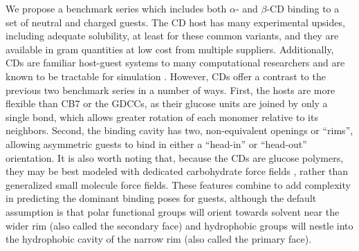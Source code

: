 \documentclass[aps,pre,twocolumn,nofootinbib,superscriptaddress,10pt, final,tightenlines]{revtex4-1}
\begin{document}
We propose a benchmark series which includes both $\alpha$- and $\beta$-CD binding to a set of neutral and charged guests. 
The CD host has many experimental upsides, including adequate solubility, at least for these common variants, and they are available in gram quantities at low cost from multiple suppliers. 
Additionally, CDs are familiar host-guest systems to many computational researchers and are known to be tractable for simulation \cite{Mark:1994:J.Am.Chem.Soc., Luzhkov:1999:ChemicalPhysicsLetters, Bea:2002:TheorChemAcc, Chen:2004:BiophysicalJournal, Sellner:2008:J.Phys.Chem.B, Cai:2009:J.Phys.Chem.B, Wickstrom:2013:J.Chem.TheoryComput., Shi:2014:TheorChemAcc, henriksen_computational_2015, Zhang:2015:J.Chem.TheoryComput., Khuntawee:2016:CarbohydratePolymers, Gebhardt:2016:FluidPhaseEquilibria, wickstrom_parameterization_2016}. 
However, CDs offer a contrast to the previous two benchmark series in a number of ways. 
First, the hosts are more flexible than CB7 or the GDCCs, as their glucose units are joined by only a single bond, which allows greater rotation of each monomer relative to its neighbors. 
Second, the binding cavity has two, non-equivalent openings or ``rims'', allowing asymmetric guests to bind in either a ``head-in'' or ``head-out'' orientation. 
It is also worth noting that, because the CDs are glucose polymers, they may be best modeled with dedicated carbohydrate force fields \cite{Kirschner:2008:J.Comput.Chem., Cezard:2011:PhysicalChemistryChemicalPhysics, Guvench:2011:J.Chem.TheoryComput., Xiong:2015:CarbohydrateResearch}, rather than generalized small molecule force fields. 
These features combine to add complexity in predicting the dominant binding poses for guests, although the default assumption is that polar functional groups will orient towards solvent near the wider rim (also called the secondary face) and hydrophobic groups will nestle into the hydrophobic cavity of the narrow rim (also called the primary face).
\end{document}
